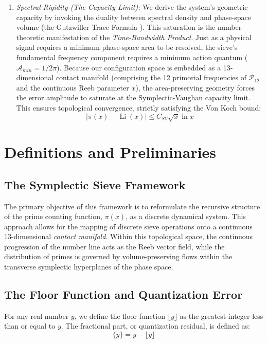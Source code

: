 \documentclass[sn-mathphys-num, pdflatex, referee]{sn-jnl}
\begin{document}
\begin{enumerate}
    \item \textit{Spectral Rigidity (The Capacity Limit):} We derive the system's geometric capacity by invoking the duality between spectral density and phase-space volume (the Gutzwiller Trace Formula \cite{gutzwiller}). This saturation is the number-theoretic manifestation of the \textit{Time-Bandwidth Product}. Just as a physical signal requires a minimum phase-space area to be resolved, the sieve's fundamental frequency component requires a minimum action quantum ($\mathcal{A}_{min} = 1/2\pi$). Because our configuration space is embedded as a 13-dimensional contact manifold (comprising the 12 primorial frequencies of $\mathcal{P}_{12}$ and the continuous Reeb parameter $x$), the area-preserving geometry forces the error amplitude to saturate at the Symplectic-Vaughan capacity limit. This ensures topological convergence, strictly satisfying the Von Koch bound:
    \begin{equation}
    |\pi(x) - \operatorname{Li}(x)| \le C_{SV} \sqrt{x} \ln x
    \end{equation}
\end{enumerate}


\section{Definitions and Preliminaries}

\subsection{The Symplectic Sieve Framework}
The primary objective of this framework is to reformulate the recursive structure of the prime counting function, $\pi(x)$, as a discrete dynamical system. This approach allows for the mapping of discrete sieve operations onto a continuous 13-dimensional \textit{contact manifold}. Within this topological space, the continuous progression of the number line acts as the Reeb vector field, while the distribution of primes is governed by volume-preserving flows within the transverse symplectic hyperplanes of the phase space.

\subsection{The Floor Function and Quantization Error}
For any real number $y$, we define the floor function $\lfloor y \rfloor$ as the greatest integer less than or equal to $y$. The fractional part, or quantization residual, is defined as:
\begin{equation}
\label{eq:fractional}
\{y\} = y - \lfloor y \rfloor
\end{equation}
\end{document}
